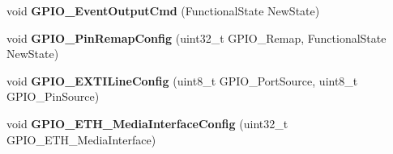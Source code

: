 \begin{DoxyCompactItemize}
\item 
\hypertarget{group__GPIO__Exported__Functions_gaf13ab3d59e467df44b492f1cdfe2f588}{
void {\bfseries GPIO\_\-EventOutputCmd} (FunctionalState NewState)}
\label{group__GPIO__Exported__Functions_gaf13ab3d59e467df44b492f1cdfe2f588}

\item 
\hypertarget{group__GPIO__Exported__Functions_ga64eb76f6211b840daf9829289df4208b}{
void {\bfseries GPIO\_\-PinRemapConfig} (uint32\_\-t GPIO\_\-Remap, FunctionalState NewState)}
\label{group__GPIO__Exported__Functions_ga64eb76f6211b840daf9829289df4208b}

\item 
\hypertarget{group__GPIO__Exported__Functions_ga8c1f13646d7418827378032a584da653}{
void {\bfseries GPIO\_\-EXTILineConfig} (uint8\_\-t GPIO\_\-PortSource, uint8\_\-t GPIO\_\-PinSource)}
\label{group__GPIO__Exported__Functions_ga8c1f13646d7418827378032a584da653}

\item 
\hypertarget{group__GPIO__Exported__Functions_gacbfad958f684347be0f2c762dc85c3c2}{
void {\bfseries GPIO\_\-ETH\_\-MediaInterfaceConfig} (uint32\_\-t GPIO\_\-ETH\_\-MediaInterface)}
\label{group__GPIO__Exported__Functions_gacbfad958f684347be0f2c762dc85c3c2}

\end{DoxyCompactItemize}
